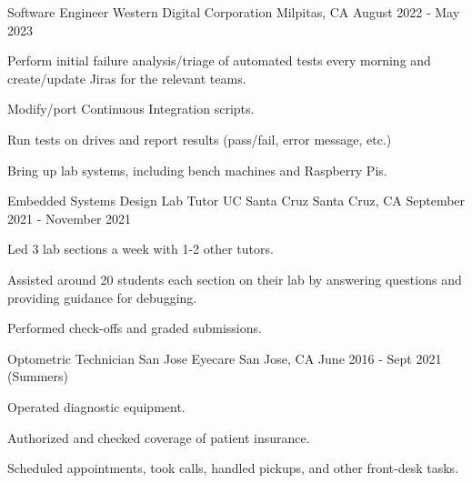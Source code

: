 
\begin{cventries}
  \cventry
    {Software Engineer} %
    {Western Digital Corporation} %
    {Milpitas, CA} %
    {August 2022 - May 2023} %
    {
      \begin{cvitems} %
        \item {Perform initial failure analysis/triage of automated tests every morning and create/update Jiras for the relevant teams.}
        \item {Modify/port Continuous Integration scripts.}
        \item {Run tests on drives and report results (pass/fail, error message, etc.)}
        \item {Bring up lab systems, including bench machines and Raspberry Pis.}
      \end{cvitems}
    }

  \cventry
    {Embedded Systems Design Lab Tutor} %
    {UC Santa Cruz} %
    {Santa Cruz, CA} %
    {September 2021 - November 2021} %
    {
      \begin{cvitems} %
        \item {Led 3 lab sections a week with 1-2 other tutors.}
        \item {Assisted around 20 students each section on their lab by answering questions and providing guidance for debugging.}
        \item {Performed check-offs and graded submissions.}
      \end{cvitems}
    }

  \cventry
    {Optometric Technician} %
    {San Jose Eyecare} %
    {San Jose, CA} %
    {June 2016 - Sept 2021 (Summers)} %
    {
      \begin{cvitems} %
        \item {Operated diagnostic equipment.}
        \item {Authorized and checked coverage of patient insurance.}
        \item {Scheduled appointments, took calls, handled pickups, and other front-desk tasks.}
      \end{cvitems}
    }
\end{cventries}

